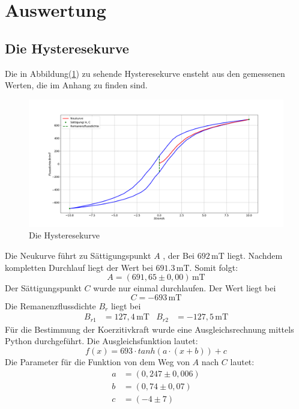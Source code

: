 
\section{Auswertung}
\subsection{Die Hysteresekurve}
Die in Abbildung(\ref{fig:hys}) zu sehende Hysteresekurve ensteht aus den gemessenen Werten,
die im Anhang zu finden sind.

  \begin{figure}
\centering
\includegraphics[width=\textwidth]{plothys.pdf}
\caption{Die Hysteresekurve}
\label{fig:hys}
\end{figure}
Die Neukurve führt zu Sättigungspunkt $A$ , der Bei $692\, \mathrm{mT}$ liegt.
Nachdem kompletten Durchlauf liegt der Wert bei $691.3\,\mathrm{mT}$.
Somit folgt:
\begin{equation}
  A = (691,65 \pm 0,00)\, \mathrm{mT}
\end{equation}
Der Sättigungspunkt $C$ wurde nur einmal durchlaufen.
Der Wert liegt bei
\begin{equation}
  C = -693 \,\mathrm{mT}
\end{equation}
 Die Remanenzflussdichte $B_r$ liegt bei
 \begin{align}
   B_{r1} &= 127,4\, \mathrm{mT} & B_{r2} &= -127,5 \, \mathrm{mT}
 \end{align}
 Für die Bestimmung der Koerzitivkraft wurde eine Ausgleichsrechnung mittels Python durchgeführt.
 Die Ausgleichsfunktion lautet:
 \begin{equation}
  f(x) = 693 \cdot tanh(a\cdot(x + b)) + c
 \end{equation}
 Die Parameter für die Funktion von dem Weg von $A$ nach $C$ lautet:
 \begin{align}
 a &= (0,247 \pm 0,006) \\
 b &= (0,74 \pm 0,07)\\
 c &= (-4 \pm 7)
 \end{align}

